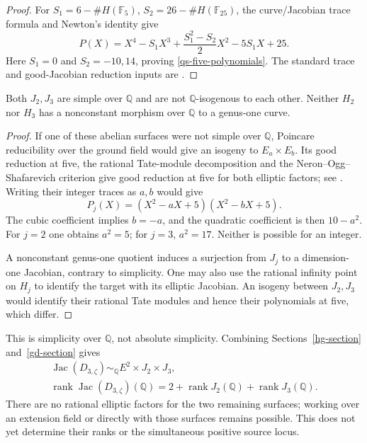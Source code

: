\begin{proof}
For \(S_1=6-\#H(\mathbb F_5)\), \(S_2=26-\#H(\mathbb F_{25})\),
the curve/Jacobian trace formula and Newton's identity give
\[
 P(X)=X^4-S_1X^3+\frac{S_1^2-S_2}{2}X^2-5S_1X+25.
\]
Here \(S_1=0\) and \(S_2=-10,14\), proving
\eqref{qs-five-polynomials}. The standard trace and good-Jacobian
reduction inputs are \cite[Theorem~11.1, Corollaries~11.4 and~12.3]{MilneJV2021}.
\end{proof}

\begin{theorem}\label{qs-simple}
Both \(J_2,J_3\) are simple over \(\mathbb Q\) and are not
\(\mathbb Q\)-isogenous to each other. Neither \(H_2\) nor \(H_3\)
has a nonconstant morphism over \(\mathbb Q\) to a genus-one curve.
\end{theorem}
\begin{proof}
If one of these abelian surfaces were not simple over \(\mathbb Q\),
Poincare reducibility over the ground field would give an isogeny to
\(E_a\times E_b\). Its good reduction at five, the rational Tate-module
decomposition and the Neron--Ogg--Shafarevich criterion give good reduction
at five for both elliptic factors; see
\cite[I, Proposition~10.1; IV, Theorem~3.5 and Corollary~3.6]{MilneAVQS}.
Writing their integer traces as \(a,b\) would give
\[
 P_j(X)=(X^2-aX+5)(X^2-bX+5).
\]
The cubic coefficient implies \(b=-a\), and the quadratic coefficient
is then \(10-a^2\). For \(j=2\) one obtains \(a^2=5\); for \(j=3\),
\(a^2=17\). Neither is possible for an integer.

A nonconstant genus-one quotient induces a surjection from \(J_j\)
to a dimension-one Jacobian, contrary to simplicity. One may also use
the rational infinity point on \(H_j\) to identify the target with its
elliptic Jacobian. An isogeny between \(J_2,J_3\) would identify their
rational Tate modules and hence their polynomials at five, which differ.
\end{proof}

This is simplicity over \(\mathbb Q\), not absolute simplicity.
Combining Sections~\ref{hg-section} and~\ref{gd-section} gives
\begin{gather}\label{qs-decomposition}
 \operatorname{Jac}(D_{3,\zeta})\sim_{\mathbb Q}E^2\times J_2\times J_3,
 \\
 \operatorname{rank}\operatorname{Jac}(D_{3,\zeta})(\mathbb Q)
 =2+\operatorname{rank}J_2(\mathbb Q)+\operatorname{rank}J_3(\mathbb Q).
\end{gather}
There are no rational elliptic factors for the two remaining surfaces;
working over an extension field or directly with those surfaces remains
possible. This does not yet determine their ranks or the simultaneous
positive source locus.

